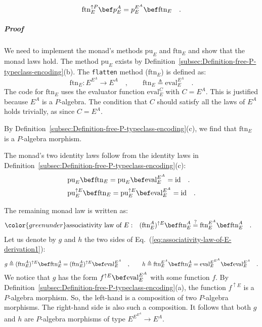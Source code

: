 \noindent ~\vspace{-1\baselineskip}
\begin{equation}
\text{ftn}_{E}^{\uparrow P}\bef p_{E}^{A}=p_{E}^{E^{A}}\bef\text{ftn}_{E}\quad.\label{eq:P-algebra-morphism-law-of-flatten}
\end{equation}


\subparagraph{Proof}

We need to implement the monad\textsf{'}s methods $\text{pu}_{E}$ and $\text{ftn}_{E}$
and show that the monad laws hold. The method $\text{pu}_{E}$ exists
by Definition~\ref{subsec:Definition-free-P-typeclass-encoding}(b).
The \lstinline!flatten!
method ($\text{ftn}_{E}$) is defined as:
\[
\text{ftn}_{E}:E^{E^{A}}\rightarrow E^{A}\quad,\quad\quad\text{ftn}_{E}\triangleq\text{eval}_{E}^{E^{A}}\quad.
\]
The code for $\text{ftn}_{E}$ uses the evaluator function $\text{eval}_{E}^{C}$
with $C=E^{A}$. This is justified because $E^{A}$ is a $P$-algebra.
The condition that $C$ should satisfy all the laws of $E^{A}$ holds
trivially, as since $C=E^{A}$.

By Definition~\ref{subsec:Definition-free-P-typeclass-encoding}(c),
we find that $\text{ftn}_{E}$ is a $P$-algebra morphism. 

The monad\textsf{'}s two identity laws follow from the identity laws in Definition~\ref{subsec:Definition-free-P-typeclass-encoding}(c):
\begin{align*}
 & \text{pu}_{E}\bef\text{ftn}_{E}=\text{pu}_{E}\bef\text{eval}_{E}^{E^{A}}=\text{id}\quad.\\
 & \text{pu}_{E}^{\uparrow E}\bef\text{ftn}_{E}=\text{pu}_{E}^{\uparrow E}\bef\text{eval}_{E}^{E^{A}}=\text{id}\quad.
\end{align*}

The remaining monad law is written as:
\begin{align}
{\color{greenunder}\text{associativity law of }E:}\quad & (\text{ftn}_{E}^{A})^{\uparrow E}\bef\text{ftn}_{E}^{A}\overset{?}{=}\text{ftn}_{E}^{E^{A}}\bef\text{ftn}_{E}^{A}\quad.\label{eq:associativity-law-of-E-derivation1}
\end{align}
Let us denote by $g$ and $h$ the two sides of Eq.~(\ref{eq:associativity-law-of-E-derivation1}):
\[
g\triangleq(\text{ftn}_{E}^{A})^{\uparrow E}\bef\text{ftn}_{E}^{A}=(\text{ftn}_{E}^{A})^{\uparrow E}\bef\text{eval}_{E}^{E^{A}}\quad,\quad\quad h\triangleq\text{ftn}_{E}^{E^{A}}\bef\text{ftn}_{E}^{A}=\text{eval}_{E}^{E^{E^{A}}}\bef\text{eval}_{E}^{E^{A}}\quad.
\]
 We notice that $g$ has the form $f^{\uparrow E}\bef\text{eval}_{E}^{E^{A}}$
with some function $f$. By Definition~\ref{subsec:Definition-free-P-typeclass-encoding}(a),
the function $f^{\uparrow E}$ is a $P$-algebra morphism. So, the
left-hand is a composition of two $P$-algebra morphisms. The right-hand
side is also such a composition. It follows that both $g$ and $h$
are $P$-algebra morphisms of type $E^{E^{E^{A}}}\rightarrow E^{A}$. 


